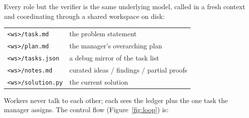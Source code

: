 \documentclass{article}
\begin{document}
Every role but the verifier is the same underlying model, called in a fresh context and
coordinating through a shared workspace on disk:

\begin{center}
\small
\begin{tabular}{@{}ll@{}}
\texttt{<ws>/task.md}     & the problem statement \\
\texttt{<ws>/plan.md}     & the manager's overarching plan \\
\texttt{<ws>/tasks.json}  & a debug mirror of the task list \\
\texttt{<ws>/notes.md}    & curated ideas / findings / partial proofs \\
\texttt{<ws>/solution.py} & the current solution \\
\end{tabular}
\end{center}

Workers never talk to each other; each sees the ledger plus the one task the manager
assigns. The control flow (Figure~\ref{fig:loop}) is:
\end{document}
